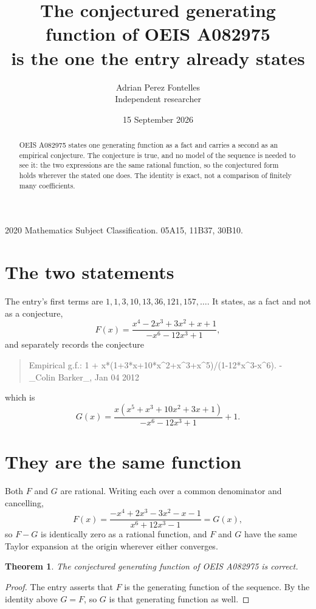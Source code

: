 \documentclass[11pt,a4paper]{article}
\title{The conjectured generating function of OEIS A082975\\ \large is the one the entry already
states}
\author{Adrian Perez Fontelles\\ \small Independent researcher}
\date{15 September 2026}
\theoremstyle{plain}
\newtheorem{theorem}{Theorem}
\theoremstyle{definition}
\begin{document}
\maketitle

\begin{abstract}
OEIS A082975 states one generating function as a fact and carries a second as an empirical
conjecture. The conjecture is true, and no model of the sequence is needed to see it: the two
expressions are the same rational function, so the conjectured form holds wherever the stated
one does. The identity is exact, not a comparison of finitely many coefficients.
\end{abstract}

\noindent\small 2020 Mathematics Subject Classification. 05A15, 11B37, 30B10.\normalsize

\section{The two statements}

The entry's first terms are $1, 1, 3, 10, 13, 36, 121, 157,\dots$. It states, as a fact and not as a conjecture,
\[
  F(x)=\frac{x^{4} - 2 x^{3} + 3 x^{2} + x + 1}{- x^{6} - 12 x^{3} + 1} ,
\]
and separately records the conjecture

\begin{quote}\raggedright Empirical g.f.: 1 + x*(1+3*x+10*x\^{}2+x\^{}3+x\^{}5)/(1-12*x\^{}3-x\^{}6). - \_Colin Barker\_, Jan 04 2012\end{quote}

\noindent which is
\[
  G(x)=\frac{x \left(x^{5} + x^{3} + 10 x^{2} + 3 x + 1\right)}{- x^{6} - 12 x^{3} + 1} + 1 .
\]

\section{They are the same function}

Both $F$ and $G$ are rational. Writing each over a common denominator and cancelling,
\[
  F(x)=\frac{- x^{4} + 2 x^{3} - 3 x^{2} - x - 1}{x^{6} + 12 x^{3} - 1}=G(x) ,
\]
so $F-G$ is identically zero as a rational function, and $F$ and $G$ have the same Taylor
expansion at the origin wherever either converges.

\begin{theorem}
The conjectured generating function of OEIS A082975 is correct.
\end{theorem}

\begin{proof}
The entry asserts that $F$ is the generating function of the sequence. By the identity above
$G=F$, so $G$ is that generating function as well.
\end{proof}
\end{document}

